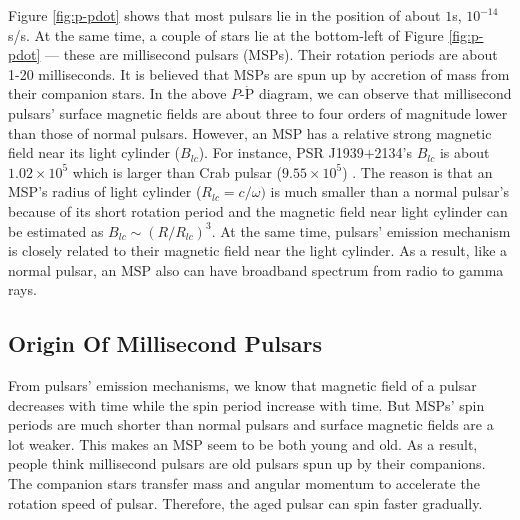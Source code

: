 \documentclass[12pt]{report}
\begin{document}
          Figure \ref{fig:p-pdot} shows that most pulsars lie in the position of about 
          $1$s, $10^{-14}$s/s. At the same time, a couple of stars lie at the bottom-left 
          of Figure \ref{fig:p-pdot} --- these are millisecond pulsars (MSPs). Their 
          rotation periods are about 1-20 milliseconds. It is believed that MSPs are spun 
          up by accretion of mass from their companion stars. In the above 
          $P$-$\dot{\mbox{P}}$ diagram, we can observe that millisecond pulsars' 
          surface magnetic fields are about three to four orders of magnitude lower than those
          of normal pulsars. However, an MSP has a relative strong magnetic field near its 
          light cylinder ($B_{lc}$). For instance, PSR J1939+2134's $B_{lc}$ is about 
          $1.02\times10^5$ which is larger than Crab pulsar ($9.55\times10^5$) \cite{ATNF}.
          The reason is that an MSP's radius 
          of light cylinder ($R_{lc}=c/\omega)$ is much smaller than a normal pulsar's 
          because of its short rotation period and the magnetic field near light cylinder can
          be estimated as $B_{lc}\sim\left(R/R_{lc}\right)^3$. At the same time, 
          pulsars' emission mechanism is closely related to their magnetic field near the light 
          cylinder. As a result, like a normal pulsar, an MSP also can have broadband spectrum 
          from radio to gamma rays. 
          \subsection{Origin Of Millisecond Pulsars}
            From pulsars' emission mechanisms, we know that magnetic field of a pulsar 
            decreases with time while the spin period increase with time. But MSPs' spin 
            periods are much shorter than normal pulsars and surface magnetic fields are a 
            lot weaker. This makes an MSP seem to be both young and old. As a result,
            people think millisecond pulsars are old pulsars spun up by their companions. 
            The companion stars transfer mass and angular momentum to accelerate the rotation
            speed of pulsar. Therefore, the aged pulsar can spin faster gradually. 
\end{document}
